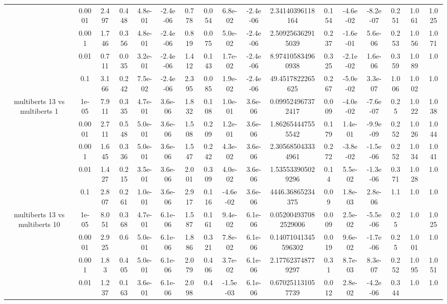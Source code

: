 \begin{tabular}{|c|c|c|c|c|c|c|c|c|c|c|c|c|c|c|c|c|}
 & 0.0001 & 2.497 & 0.448 & 4.8e-01 & -2.4e-06 & 0.778 & 0.054 & 6.8e-02 & -2.4e-06 & 2.34140396118164 & 0.154 & -4.6e-02 & -8.2e-07 & 0.251 & 1.061 & 1.025 \\
 & 0.001 & 1.746 & 0.356 & 4.8e-01 & -2.4e-06 & 0.819 & 0.075 & 5.0e-02 & -2.4e-06 & 2.509256362915039 & 0.237 & -1.6e-01 & 5.6e-06 & 0.253 & 1.056 & 1.071 \\
 & 0.01 & 0.711 & 0.035 & 3.2e-01 & -2.4e-06 & 1.412 & 0.143 & 1.7e-02 & -2.4e-06 & 8.974105834960938 & 0.325 & -2.1e-02 & 1.6e-06 & 0.359 & 1.089 & 1.0 \\
 & 0.1 & 3.166 & 0.242 & 7.5e-02 & -2.4e-06 & 2.395 & 0.085 & 1.9e-02 & -2.4e-06 & 49.4517822265625 & 0.267 & -5.0e-02 & 3.3e-07 & 1.006 & 1.002 & 1.0 \\
\hline
\multirow{5}{*}{multiberts 13 vs multiberts 1} & 1e-05 & 7.911 & 0.335 & 4.7e-01 & 3.6e-06 & 1.832 & 0.108 & 1.0e-01 & 3.6e-06 & 0.099524967372417 & 0.009 & -4.0e-02 & -7.6e-07 & 0.25 & 1.022 & 1.038 \\
 & 0.0001 & 2.711 & 0.548 & 5.0e-01 & 3.6e-06 & 1.508 & 0.209 & 1.2e-01 & 3.6e-06 & 1.862654447555542 & 0.179 & 1.4e-01 & -9.9e-09 & 0.252 & 1.026 & 1.044 \\
 & 0.001 & 1.645 & 0.336 & 5.0e-01 & 3.6e-06 & 1.547 & 0.242 & 4.3e-02 & 3.6e-06 & 2.305685043334961 & 0.272 & -3.8e-02 & -1.5e-06 & 0.252 & 1.034 & 1.041 \\
 & 0.01 & 1.427 & 0.215 & 3.5e-01 & 3.6e-06 & 2.001 & 0.309 & 4.0e-02 & 3.6e-06 & 1.535533905029296 & 0.14 & 5.5e-02 & -1.3e-06 & 0.371 & 1.028 & 1.0 \\
 & 0.1 & 2.807 & 0.261 & 1.0e-01 & 3.6e-06 & 2.917 & 0.116 & -4.6e-02 & 3.6e-06 & 4446.36865234375 & 0.09 & 1.8e-03 & 2.8e-06 & 1.1 & 1.0 & 1.0 \\
\hline
\multirow{5}{*}{multiberts 13 vs multiberts 10} & 1e-05 & 8.051 & 0.368 & 4.7e-01 & 6.1e-06 & 1.587 & 0.161 & 9.4e-02 & 6.1e-06 & 0.052004937082529006 & 0.009 & 2.5e-02 & -5.5e-06 & 0.25 & 1.0 & 1.025 \\
 & 0.0001 & 2.925 & 0.6 & 5.0e-01 & 6.1e-06 & 1.886 & 0.321 & 7.8e-02 & 6.1e-06 & 0.14071041345596302 & 0.019 & 9.6e-02 & -1.7e-06 & 0.25 & 1.001 & 1.0 \\
 & 0.001 & 1.83 & 0.405 & 5.0e-01 & 6.1e-06 & 2.079 & 0.406 & 3.7e-02 & 6.1e-06 & 2.177623748779297 & 0.31 & 8.7e-03 & 8.3e-07 & 0.252 & 1.095 & 1.051 \\
 & 0.01 & 1.237 & 0.163 & 3.6e-01 & 6.1e-06 & 2.098 & 0.4 & -1.5e-03 & 6.1e-06 & 0.670251131057739 & 0.012 & 2.8e-02 & -4.2e-06 & 0.344 & 1.0 & 1.0 \\

\end{tabular}
